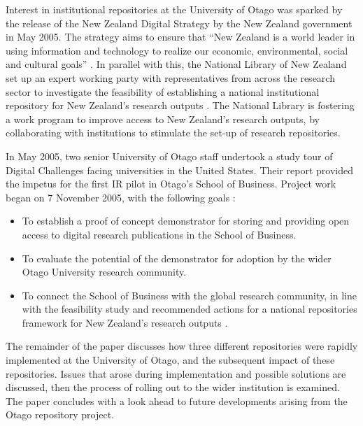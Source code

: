 \documentclass[12pt,pdftex,a4paper,titlepage]{article}
\begin{document}
Interest in institutional repositories at the University of Otago was sparked by the release of the New Zealand Digital Strategy by the New Zealand government in May 2005. The strategy aims to ensure that ``New Zealand is a world leader in using information and technology to realize our economic, environmental, social and cultural goals'' \cite{NZG-2005-digital_strategy}. In parallel with this, the National Library of New Zealand set up an expert working party with representatives from across the research sector to investigate the feasibility of establishing a national institutional repository for New Zealand's research outputs \cite{Rank-J-2005-feasibility}. The National Library is fostering a work program to improve access to New Zealand's research outputs, by collaborating with institutions to stimulate the set-up of research repositories.

In May 2005, two senior University of Otago staff undertook a study tour of Digital Challenges facing universities in the United States. Their report provided the impetus for the first IR pilot in Otago's School of Business. Project work began on 7 November 2005, with the following goals \cite{Stan-N-2006-running}:
\begin{itemize}

	\item To establish a proof of concept demonstrator for storing and providing open access to digital research publications in the School of Business.

	\item To evaluate the potential of the demonstrator for adoption by the wider Otago University research community.

	\item To connect the School of Business with the global research community, in line with the feasibility study and recommended actions for a national repositories framework for New Zealand's research outputs \cite{Rank-J-2005-feasibility}.

\end{itemize}

The remainder of the paper discusses how three different repositories were rapidly implemented at the University of Otago, and the subsequent impact of these repositories. Issues that arose during implementation and possible solutions are discussed, then the process of rolling out to the wider institution is examined. The paper concludes with a look ahead to future developments arising from the Otago repository project.
\end{document}
